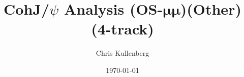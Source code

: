 \title{CohJ/$\psi$ Analysis (\textbf{OS}-$\boldsymbol{\mu\mu}$)(\textbf{Other})(\textbf{4-track})}
\author{Chris Kullenberg}
\date{\today}
